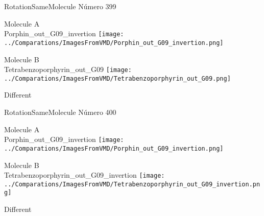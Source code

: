 \vtab[-2cm]
\begin{center}
{\large RotationSameMolecule \tab Número 399}
\end{center}
\begin{multicols}{2}
\begin{center}
Molecule A \\ 
Porphin\_out\_G09\_invertion
\texttt{[image: ../Comparations/ImagesFromVMD/Porphin\_out\_G09\_invertion.png]}
\\
\vtab

\columnbreak
Molecule B \\ 
Tetrabenzoporphyrin\_out\_G09
\texttt{[image: ../Comparations/ImagesFromVMD/Tetrabenzoporphyrin\_out\_G09.png]}
\\
\vtab


\end{center}
\end{multicols}
\begin{center}
\vtab
\vtab
\textcolor{NavyBlue}{\Large Different}
\end{center}

 \newpage

\vtab[-2cm]
\begin{center}
{\large RotationSameMolecule \tab Número 400}
\end{center}
\begin{multicols}{2}
\begin{center}
Molecule A \\ 
Porphin\_out\_G09\_invertion
\texttt{[image: ../Comparations/ImagesFromVMD/Porphin\_out\_G09\_invertion.png]}
\\
\vtab

\columnbreak
Molecule B \\ 
Tetrabenzoporphyrin\_out\_G09\_invertion
\texttt{[image: ../Comparations/ImagesFromVMD/Tetrabenzoporphyrin\_out\_G09\_invertion.png]}
\\
\vtab


\end{center}
\end{multicols}
\begin{center}
\vtab
\vtab
\textcolor{NavyBlue}{\Large Different}
\end{center}

 \newpage

